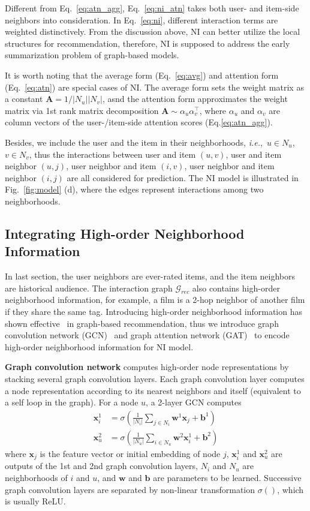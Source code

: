 \documentclass[sigconf]{acmart}
\newcommand{\mG}{\mathcal{G}}
\newcommand{\bw}{\mathbf{w}}
\newcommand{\bx}{\mathbf{x}}
\newcommand{\bb}{\mathbf{b}}
\newcommand{\new}[1]{{\color{black} #1}}
\newcommand{\ie}{\emph{i.e.},~}
\begin{document}
Different from Eq.~\eqref{eq:atn_agg}, Eq.~\eqref{eq:ni_atn} takes both user- and item-side neighbors into consideration.
In Eq.~\eqref{eq:ni}, different interaction terms are weighted distinctively. From the discussion above, NI can better utilize the local structures for recommendation, therefore, NI is supposed to address the early summarization problem of graph-based models.

It is worth noting that the average form (Eq.~\eqref{eq:avg}) and attention form (Eq.~\eqref{eq:atn}) are special cases of NI. The average form sets the weight matrix as a constant $\mathbf{A} = 1/|N_u| |N_v|$, asnd the attention form approximates the weight matrix via 1st rank matrix decomposition $\mathbf{A} \sim \alpha_u \alpha_v^\top$, where $\alpha_u$ and $\alpha_v$ are column vectors of the user-/item-side attention scores (Eq.\eqref{eq:atn_agg}). 

Besides, we include the user and the item in their neighborhoods, \ie $u \in N_u$, $v \in N_v$, thus the interactions between user and item $(u, v)$, user and item neighbor $(u, j)$, user neighbor and item $(i, v)$, user neighbor and item neighbor $(i, j)$ are all considered for prediction.
The NI model is illustrated in Fig.~\ref{fig:model} (d), where the edges represent interactions among two neighborhoods.

\subsection{Integrating High-order Neighborhood Information}\label{sec:high-order}

\new{In last section, the user neighbors are ever-rated items, and the item neighbors are historical audience. The interaction graph $\mG_{rec}$ also contains high-order neighborhood information, for example, a film is a 2-hop neighbor of another film if they share the same tag. Introducing high-order neighborhood information has shown effective~\cite{van2017graph,ying2018graph,wang2017graphgan} in graph-based recommendation, thus we introduce graph convolution network (GCN)~\cite{kipf2016semi} and graph attention network (GAT)~\cite{velickovic2017graph} to encode high-order neighborhood information for NI model.}

\textbf{Graph convolution network} computes high-order node representations by stacking several graph convolution layers. Each graph convolution layer computes a node representation according to its nearest neighbors and itself (equivalent to a self loop in the graph). For a node $u$, a 2-layer GCN computes
\begin{align}
\bx_i^1 & = \sigma(\frac{1}{|N_i|} \sum_{j \in N_i} {\bw^1} \bx_j + \bb^1) \\
\bx_u^2 & = \sigma(\frac{1}{|N_u|} \sum_{i \in N_u} {\bw^2} \bx_i^1 + \bb^2) \label{eq:gcn}
\end{align}
where $\bx_j$ is the feature vector or initial embedding of node $j$, $\bx_i^1$ and $\bx_u^2$ are outputs of the 1st and 2nd graph convolution layers, $N_i$ and $N_u$ are neighborhoods of $i$ and $u$, and $\bw$ and $\bb$ are parameters to be learned. Successive graph convolution layers are separated by non-linear transformation $\sigma()$, which is usually ReLU.
\end{document}
